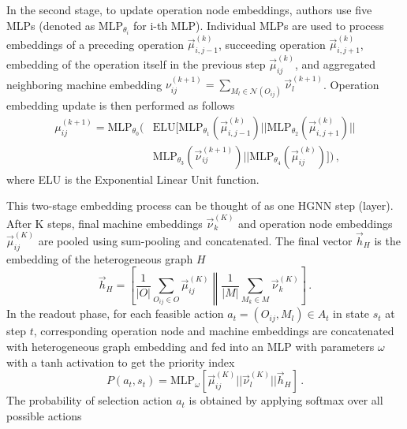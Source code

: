 In the second stage, to update operation node embeddings, authors use five MLPs (denoted as $\text{MLP}_{\theta_i}$ for i-th MLP). Individual MLPs are used to process embeddings of a preceding operation $\vec{\mu}_{i,j-1}^{(k)}$, succeeding operation $\vec{\mu}_{i,j+1}^{(k)}$, embedding of the operation itself in the previous step $\vec{\mu}_{ij}^{(k)}$, and aggregated neighboring machine embedding $\nu_{ij}^({k+1}) = \sum_{M_l\in\mathcal{N}(O_{ij})} \vec{\nu}_l^{(k+1)}$. Operation embedding update is then performed as follows \cite{9826438}
\begin{equation}
    \begin{split}
        \mu_{ij}^{(k+1)}  = \text{MLP}_{\theta_0} \Bigg( 
            &\text{ELU} \Big[ 
                \text{MLP}_{\theta_1}\left(\vec{\mu}_{i,j-1}^{(k)}\right) || 
                \text{MLP}_{\theta_2}\left(\vec{\mu}_{i,j+1}^{(k)}\right) || \\
                &\text{MLP}_{\theta_3}\left(\vec{\nu}_{ij}^{(k+1)}\right) || 
                \text{MLP}_{\theta_4}\left(\vec{\mu}_{ij}^{(k)}\right)
            \Big]    
        \Bigg) \, ,
\end{split}
\end{equation}
where ELU is the Exponential Linear Unit function.
\par
This two-stage embedding process can be thought of as one HGNN step (layer). After K steps, final machine embeddings $\vec{\nu}_k^{(K)}$ and operation node embeddings $\vec{\mu}_{ij}^{(K)}$ are pooled using sum-pooling and concatenated. The final vector $\vec{h}_H$ is the embedding of the heterogeneous graph $H$ \cite{9826438}
\begin{equation}
    \vec{h}_H = 
        \left [
            \frac{1}{|O|}\sum_{O_{ij} \in O} \vec{\mu}_{ij}^{(K)} 
            \middle\| 
            \frac{1}{|M|}\sum_{M_k \in M} \vec{\nu}_k^{(K)}
        \right ] \, .
\end{equation}
In the readout phase, for each feasible action $a_t = (O_{ij}, M_l) \in A_t$ in state $s_t$ at step $t$, corresponding operation node and machine embeddings are concatenated with heterogeneous graph embedding and fed into an MLP with parameters $\omega$ with a tanh activation to get the priority index \cite{9826438}
\begin{equation}
    P(a_t, s_t) = \text{MLP}_{\omega} \left [ \vec{\mu}_{ij}^{(K)} || \vec{\nu}_l^{(K)} || \vec{h}_H \right ] \, .
\end{equation}
The probability of selection action $a_t$ is obtained by applying softmax over all possible actions
